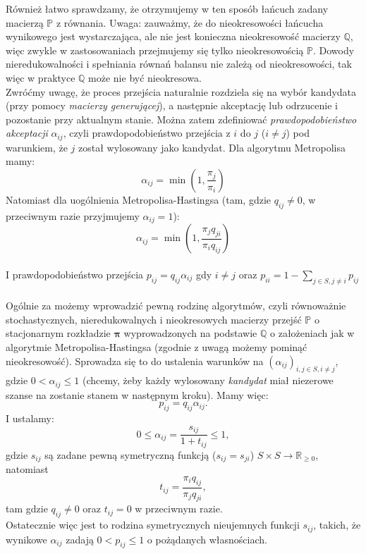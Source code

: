 \documentclass[a4paper]{article}
\theoremstyle{defn}
\theoremstyle{theorem}
\theoremstyle{lemma}
\theoremstyle{cor}
\theoremstyle{fact}
\begin{document}
Również łatwo sprawdzamy, że otrzymujemy w ten sposób łańcuch zadany macierzą $\mathbb{P}$ z równania. Uwaga: zauważmy, że do nieokresowości łańcucha wynikowego jest wystarczająca, ale nie jest konieczna nieokresowość macierzy $\mathbb{Q}$, więc zwykle w zastosowaniach przejmujemy się tylko nieokresowością $\mathbb{P}$. Dowody nieredukowalności i spełniania równań balansu nie zależą od nieokresowości, tak więc w praktyce $\mathbb{Q}$ może nie być nieokresowa. \\
Zwróćmy uwagę, że proces przejścia naturalnie rozdziela się na wybór kandydata (przy pomocy \textit{macierzy generującej}), a następnie akceptację lub odrzucenie i pozostanie przy aktualnym stanie. Można zatem zdefiniować \textit{prawdopodobieństwo akceptacji} $\alpha_{ij}$, czyli prawdopodobieństwo przejścia z $i$ do $j$ ($i \neq j$) pod warunkiem, że $j$ został wylosowany jako kandydat. Dla algorytmu Metropolisa mamy:
$$\alpha_{ij} = \min(1, \frac{\pi_j}{\pi_i})$$
Natomiast dla uogólnienia Metropolisa-Hastingsa (tam, gdzie $q_{ij} \neq 0$, w przeciwnym razie przyjmujemy $\alpha_{ij} = 1$):
$$\alpha_{ij} = \min(1, \frac{\pi_j q_{ji}}{\pi_i q_{ij}})$$
\\
I prawdopodobieństwo przejścia $p_{ij} = q_{ij}\alpha_{ij}$ gdy $i \neq j$ oraz $p_{ii} = 1 - \sum\limits_{j \in S, j \neq i} p_{ij}$\\\\
Ogólnie za \cite{hastings} możemy wprowadzić pewną rodzinę algorytmów, czyli równoważnie stochastycznych, nieredukowalnych i nieokresowych macierzy przejść $\mathbb{P}$ o stacjonarnym rozkładzie $\boldsymbol{\pi}$ wyprowadzonych na podstawie $\mathbb{Q}$ o założeniach jak w algorytmie Metropolisa-Hastingsa (zgodnie z uwagą możemy pominąć nieokresowość). Sprowadza się to do ustalenia warunków na $(\alpha_{ij})_{i,j \in S, i \neq j}$, gdzie $0 < \alpha_{ij} \leq 1$ (chcemy, żeby każdy wylosowany \textit{kandydat} miał niezerowe szanse na zostanie stanem w następnym kroku). Mamy więc:  $$p_{ij} = q_{ij}\alpha_{ij}.$$
I ustalamy:
$$ 0 \leq \alpha_{ij} = \frac{s_{ij}}{1+t_{ij}} \leq 1,$$
gdzie  $s_{ij}$ są zadane pewną symetryczną funkcją ($s_{ij} = s_{ji}$) $S \times S \to \mathbb{R}_{\geq 0}$, natomiast $$t_{ij} = \frac{\pi_i q_{ij}}{\pi_j q_{ji}},$$
tam gdzie $q_{ij} \neq 0$ oraz $t_{ij} = 0$ w przeciwnym razie.\\

Ostatecznie więc jest to rodzina symetrycznych nieujemnych funkcji $s_{ij}$, takich, że wynikowe $\alpha_{ij}$ zadają $0 < p_{ij} \leq 1$ o pożądanych własnościach.\\
\end{document}
